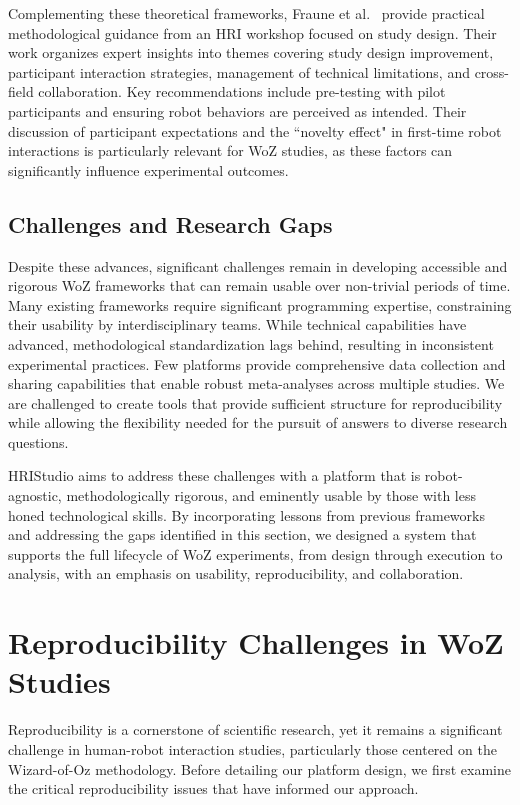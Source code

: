 \documentclass[letterpaper, 10 pt, conference]{subfiles/ieeeconf}
\begin{document}
Complementing these theoretical frameworks, Fraune et al.~\cite{Fraune2022} provide practical methodological guidance from an HRI workshop focused on study design. Their work organizes expert insights into themes covering study design improvement, participant interaction strategies, management of technical limitations, and cross-field collaboration. Key recommendations include pre-testing with pilot participants and ensuring robot behaviors are perceived as intended. Their discussion of participant expectations and the ``novelty effect" in first-time robot interactions is particularly relevant for WoZ studies, as these factors can significantly influence experimental outcomes.

\subsection{Challenges and Research Gaps}

Despite these advances, significant challenges remain in developing accessible and rigorous WoZ frameworks that can remain usable over non-trivial periods of time. Many existing frameworks require significant programming expertise, constraining their usability by interdisciplinary teams. While technical capabilities have advanced, methodological standardization lags behind, resulting in inconsistent experimental practices. Few platforms provide comprehensive data collection and sharing capabilities that enable robust meta-analyses across multiple studies. We are challenged to create tools that provide sufficient structure for reproducibility while allowing the flexibility needed for the pursuit of answers to diverse research questions.

HRIStudio aims to address these challenges with a platform that is robot-agnostic, methodologically rigorous, and eminently usable by those with less honed technological skills. By incorporating lessons from previous frameworks and addressing the gaps identified in this section, we designed a system that supports the full lifecycle of WoZ experiments, from design through execution to analysis, with an emphasis on usability, reproducibility, and collaboration.

\section{Reproducibility Challenges in WoZ Studies}
\label{repchallenges}

Reproducibility is a cornerstone of scientific research, yet it remains a significant challenge in human-robot interaction studies, particularly those centered on the Wizard-of-Oz methodology. Before detailing our platform design, we first examine the critical reproducibility issues that have informed our approach.
\end{document}
